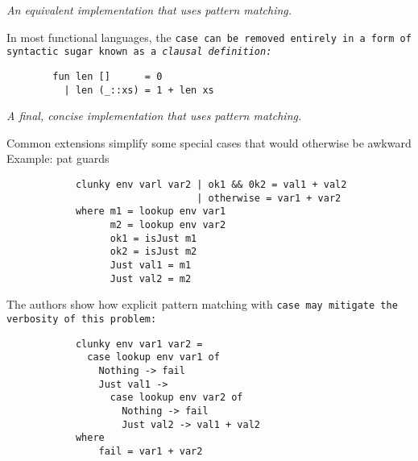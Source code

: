 \documentclass[manuscript,screen,review, 12pt]{acmart}
\begin{document}
\begin{outline}[enumerate]
    \it{An equivalent implementation that uses pattern matching.}
    
    In most functional languages, the \tt{case} can be removed entirely in a form of
    syntactic sugar known as a \it{clausal definition}:
    \begin{lstlisting}
        fun len []      = 0
          | len (_::xs) = 1 + len xs
        \end{lstlisting}
    
    \it{A final, concise implementation that uses pattern matching.}

    \1 Common extensions simplify some special cases that would otherwise be awkward
        \2 Example: pat guards
        \begin{verbatim}
            clunky env varl var2 | ok1 && 0k2 = val1 + val2 
                                 | otherwise = var1 + var2 
            where m1 = lookup env var1 
                  m2 = lookup env var2
                  ok1 = isJust m1 
                  ok2 = isJust m2 
                  Just val1 = m1 
                  Just val2 = m2    
        \end{verbatim}
        
        
        The authors show how explicit pattern matching with \tt{case} may mitigate the
        verbosity of this problem:
        
        \begin{verbatim}
            clunky env var1 var2 = 
              case lookup env var1 of 
                Nothing -> fail 
                Just val1 -> 
                  case lookup env var2 of 
                    Nothing -> fail 
                    Just val2 -> val1 + val2
            where 
                fail = var1 + var2
        \end{verbatim}
        

\end{outline}
\end{document}
